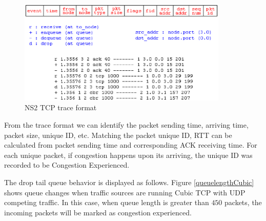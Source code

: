 \begin{figure}
\centering
\includegraphics[width=10cm]{format.eps}
\caption{NS2 TCP trace format}
\label{NS2Format}
\end{figure}
From the trace format we can identify the packet sending time, arriving time, packet size, unique ID, etc. Matching the packet unique ID, RTT can be calculated from packet sending time and corresponding ACK receiving time. For each unique packet, if congestion happens upon its arriving, the unique ID was recorded to be Congestion Experienced.

\par The drop tail queue behavior is displayed as follows.
Figure \ref{queuelengthCubic} shows queue changes when traffic sources are running Cubic TCP with UDP competing traffic. 
In this case, when queue length is greater than $450$ packets, the incoming packets will be marked as congestion experienced.


